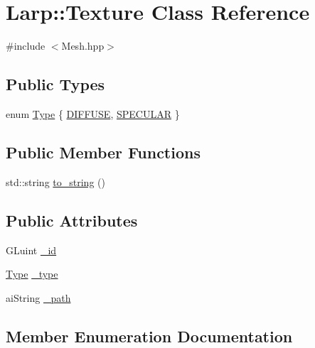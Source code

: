 \hypertarget{classLarp_1_1Texture}{}\section{Larp\+:\+:Texture Class Reference}
\label{classLarp_1_1Texture}


{\ttfamily \#include $<$Mesh.\+hpp$>$}

\subsection*{Public Types}
\begin{DoxyCompactItemize}
\item 
enum \hyperlink{classLarp_1_1Texture_aa4e19b5df6a8f1f0eae8235db7e52daa}{Type} \{ \hyperlink{classLarp_1_1Texture_aa4e19b5df6a8f1f0eae8235db7e52daaa99b3b29878c69b4fc932de604ce39581}{D\+I\+F\+F\+U\+SE}, 
\hyperlink{classLarp_1_1Texture_aa4e19b5df6a8f1f0eae8235db7e52daaa5d8421e01e03aeb7f2911890a0a138b4}{S\+P\+E\+C\+U\+L\+AR}
 \}
\end{DoxyCompactItemize}
\subsection*{Public Member Functions}
\begin{DoxyCompactItemize}
\item 
std\+::string \hyperlink{classLarp_1_1Texture_aa5ab3d71dc56dafc3e4620bfaf4e619b}{to\+\_\+string} ()
\end{DoxyCompactItemize}
\subsection*{Public Attributes}
\begin{DoxyCompactItemize}
\item 
G\+Luint \hyperlink{classLarp_1_1Texture_a123213a957b3d3ca92ea5439c12a1097}{\+\_\+id}
\item 
\hyperlink{classLarp_1_1Texture_aa4e19b5df6a8f1f0eae8235db7e52daa}{Type} \hyperlink{classLarp_1_1Texture_a5db004a6f9355d7c055bbf036b5bc2f4}{\+\_\+type}
\item 
ai\+String \hyperlink{classLarp_1_1Texture_aed77d19ec08af05131aa054df2f937b9}{\+\_\+path}
\end{DoxyCompactItemize}


\subsection{Member Enumeration Documentation}
